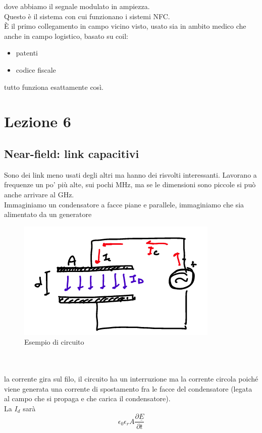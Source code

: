 \documentclass[oneside, 12pt]{extbook}
\begin{document}
dove abbiamo il segnale modulato in ampiezza.\\Questo è il sistema con cui funzionano i sistemi NFC.\\È il primo collegamento in campo vicino visto, usato sia in ambito medico che anche in campo logistico, basato su coil:
\begin{itemize}
	\item patenti
	\item codice fiscale
\end{itemize}
tutto funziona esattamente così.


\chapter{Lezione 6}


\section{Near-field: link capacitivi}
Sono dei link meno usati degli altri ma hanno dei risvolti interessanti. Lavorano a frequenze un po' più alte, sui pochi MHz, ma se le dimensioni sono piccole si può anche arrivare al GHz.\\Immaginiamo un condensatore a facce piane e parallele, immaginiamo che sia alimentato da un generatore \\
\begin{figure}[!h]
	\includegraphics[scale=0.7]{immagini/circ_cap_link.png}
	\caption{Esempio di circuito}
\end{figure}\\\\
la corrente gira sul filo, il circuito ha un interruzione ma la corrente circola poiché viene generata una corrente di spostamento fra le facce del condensatore (legata al campo che si propaga e che carica il condensatore).\\La $I_d$ sarà
\begin{equation}
	\epsilon_0 \epsilon_r A \frac{\partial\underline{E}}{\partial t}
\end{equation}
\end{document}

